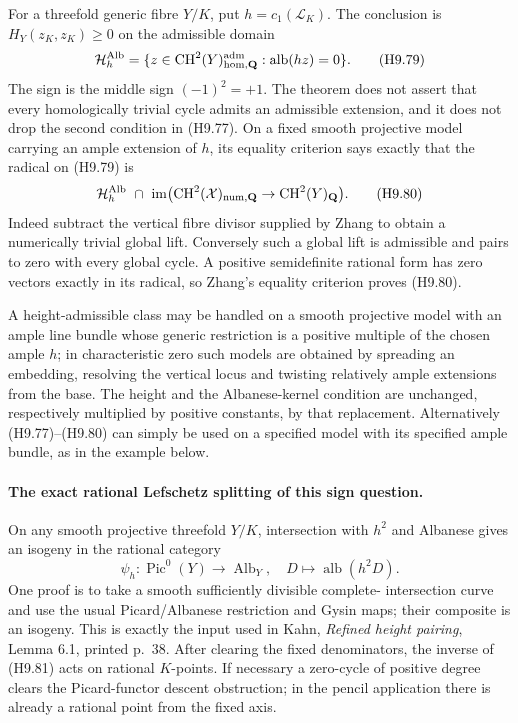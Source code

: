 \documentclass[11pt,a4paper]{article}
\begin{document}
For a threefold generic fibre $Y/K$, put $h=c_1(\mathcal L_K)$.
The conclusion is $H_Y(z_K,z_K)\ge0$ on the admissible domain
\[
 \mathcal H_h^{\rm Alb}
    =\{z\in\operatorname{CH}^2(Y)_{\rm hom,\mathbf Q}^{\rm adm}:
                  \operatorname{alb}(hz)=0\}.               \tag{H9.79}
\]
The sign is the middle sign $(-1)^2=+1$. The theorem does not
assert that every homologically trivial cycle admits an admissible
extension, and it does not drop the second condition in (H9.77).
On a fixed smooth projective model carrying an ample extension of
$h$, its equality criterion says exactly that the radical on
(H9.79) is
\[
 \mathcal H_h^{\rm Alb}\ \cap\
 \operatorname{im}\bigl(\operatorname{CH}^2(\mathcal X)_{
      \rm num,\mathbf Q}\to\operatorname{CH}^2(Y)_{\mathbf Q}\bigr).
                                                               \tag{H9.80}
\]
Indeed subtract the vertical fibre divisor supplied by Zhang to
obtain a numerically trivial global lift. Conversely such a global
lift is admissible and pairs to zero with every global cycle. A
positive semidefinite rational form has zero vectors exactly in
its radical, so Zhang's equality criterion proves (H9.80).

A height-admissible class may be handled on a smooth projective
model with an ample line bundle whose generic restriction is a
positive multiple of the chosen ample $h$; in characteristic zero
such models are obtained by spreading an embedding, resolving the
vertical locus and twisting relatively ample extensions from the
base. The height and the Albanese-kernel condition are unchanged,
respectively multiplied by positive constants, by that replacement.
Alternatively (H9.77)--(H9.80) can simply be used on a specified
model with its specified ample bundle, as in the example below.

\paragraph{The exact rational Lefschetz splitting of this sign question.}
On any smooth projective threefold $Y/K$, intersection with $h^2$
and Albanese gives an isogeny in the rational category
\[
 \psi_h:\operatorname{Pic}^0(Y)\longrightarrow\operatorname{Alb}_Y,
             \quad D\longmapsto\operatorname{alb}(h^2D).
                                                               \tag{H9.81}
\]
One proof is to take a smooth sufficiently divisible complete-
intersection curve and use the usual Picard/Albanese restriction
and Gysin maps; their composite is an isogeny. This is exactly the
input used in Kahn, \emph{Refined height pairing}, Lemma 6.1,
printed p.~38. After clearing the fixed denominators, the inverse
of (H9.81) acts on rational $K$-points. If necessary a zero-cycle
of positive degree clears the Picard-functor descent obstruction;
in the pencil application there is already a rational point from
the fixed axis.
\end{document}
